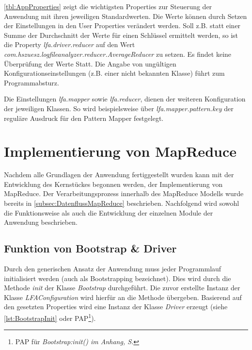 \autoref{tbl:AppProperties} zeigt die wichtigsten Properties zur Steuerung der Anwendung mit ihren jeweiligen Standardwerten. Die Werte können durch Setzen der Einstellungen in den User Properties verändert werden. Soll z.B. statt einer Summe der Durchschnitt der Werte für einen Schlüssel ermittelt werden, so ist die Property \textit{lfa.driver.reducer} auf den Wert \textit{com.hszuesz.logfileanalyzer.reducer.AverageReducer} zu setzen. Es findet keine Überprüfung der Werte Statt. Die Angabe von ungültigen Konfigurationseinstellungen (z.B. einer nicht bekannten Klasse) führt zum Programmabsturz.

Die Einstellungen \textit{lfa.mapper} sowie \textit{lfa.reducer}, dienen der weiteren Konfiguration der jeweiligen Klassen. So wird beispielsweise über \textit{lfa.mapper.pattern.key} der reguläre Ausdruck für den Pattern Mapper festgelegt.



\section{Implementierung von MapReduce}
Nachdem alle Grundlagen der Anwendung fertiggestellt wurden kann mit der Entwicklung des Kernstückes begonnen werden, der Implementierung von MapReduce. Der Verarbeitungsprozess innerhalb des MapReduce Modells wurde bereits in \autoref{subsec:DatenflussMapReduce} beschrieben. Nachfolgend wird sowohl die Funktionsweise als auch die Entwicklung der einzelnen Module der Anwendung beschrieben.

\subsection{Funktion von Bootstrap \& Driver}
Durch den generischen Ansatz der Anwendung muss jeder Programmlauf initialisiert werden (auch als \gls{Bootstrapping} bezeichnet). Dies wird durch die Methode \textit{init} der Klasse \textit{Bootstrap} durchgeführt. Die zuvor erstellte Instanz der Klasse \textit{LFAConfiguration} wird hierfür an die Methode übergeben. Basierend auf den gesetzten Properties wird eine Instanz der Klasse \textit{Driver} erzeugt (siehe \autoref{lst:BootstrapInit} oder \ac{PAP}\footnote{\ac{PAP} für \textit{Bootstrap:init() im Anhang, S. \pageref{subsec:PAPBootstrapInit}}}).

